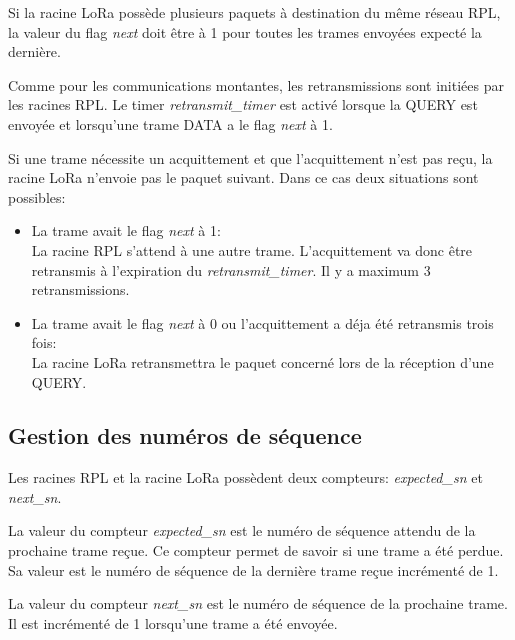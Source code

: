     Si la racine LoRa possède plusieurs paquets à destination du même réseau RPL, la valeur du flag \textit{next} doit être à 1 pour toutes les trames envoyées expecté la dernière.

    Comme pour les communications montantes, les retransmissions sont initiées par les racines RPL.
    Le timer \textit{retransmit\_timer} est activé lorsque la QUERY est envoyée et lorsqu'une trame DATA a le flag \textit{next} à 1.

    Si une trame nécessite un acquittement et que l'acquittement n'est pas reçu, la racine LoRa n'envoie pas le paquet suivant. Dans ce cas deux situations sont possibles:
    \begin{itemize}
        \item La trame avait le flag \textit{next} à 1:\\
            La racine RPL s'attend à une autre trame. L'acquittement va donc être retransmis à l'expiration du \textit{retransmit\_timer}. Il y a maximum 3 retransmissions.
        \item La trame avait le flag \textit{next} à 0 ou l'acquittement a déja été retransmis trois fois:\\
            La racine LoRa retransmettra le paquet concerné lors de la réception d'une QUERY.
    \end{itemize}

\subsection*{Gestion des numéros de séquence}
    Les racines RPL et la racine LoRa possèdent deux compteurs: \textit{expected\_sn} et \textit{next\_sn}.

    La valeur du compteur \textit{expected\_sn} est le numéro de séquence attendu de la prochaine trame reçue. Ce compteur permet de savoir si une trame a été perdue. Sa valeur est le numéro de séquence de la dernière trame reçue incrémenté de 1.

    La valeur du compteur \textit{next\_sn} est le numéro de séquence de la prochaine trame. Il est incrémenté de 1 lorsqu'une trame a été envoyée.

